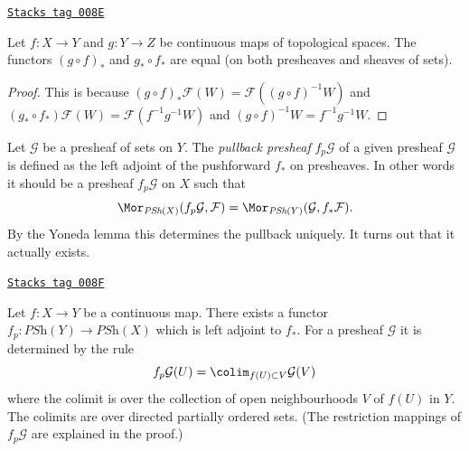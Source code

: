 \begin{lemma}
\label{sheaves-lemma-pushforward-composition}
\href{https://stacks.math.columbia.edu/tag/008E}{\texttt{Stacks tag 008E}}

Let $f : X \to Y$ and $g : Y \to Z$ be continuous maps
of topological spaces. The functors $(g \circ f)_*$
and $g_* \circ f_*$ are equal (on both presheaves
and sheaves of sets).
\end{lemma}

\begin{proof}
This is because $(g \circ f)_*\mathcal{F}(W) =
\mathcal{F}((g \circ f)^{-1}W)$ and
$(g_* \circ f_*)\mathcal{F}(W) = \mathcal{F}(f^{-1} g^{-1} W)$
and $(g \circ f)^{-1}W = f^{-1} g^{-1} W$.
\end{proof}

Let $\mathcal{G}$ be a presheaf of sets on $Y$.
The {\it pullback presheaf} $f_p\mathcal{G}$
of a given presheaf $\mathcal{G}$ is defined as the left adjoint
of the pushforward $f_*$ on presheaves. In other words it
should be a presheaf $f_p \mathcal{G}$ on $X$ such that
$$
\Mor_{\textit{PSh}(X)}(f_p\mathcal{G}, \mathcal{F})
=
\Mor_{\textit{PSh}(Y)}(\mathcal{G}, f_*\mathcal{F}).
$$
By the Yoneda lemma this determines the pullback uniquely.
It turns out that it actually exists.

\begin{lemma}
\label{sheaves-lemma-pullback-presheaves}
\href{https://stacks.math.columbia.edu/tag/008F}{\texttt{Stacks tag 008F}}

Let $f : X \to Y$ be a continuous map.
There exists a functor
$f_p : \textit{PSh}(Y) \to \textit{PSh}(X)$
which is left adjoint to $f_*$. For a presheaf
$\mathcal{G}$ it is determined by the rule
$$
f_p\mathcal{G}(U) = \colim_{f(U) \subset V} \mathcal{G}(V)
$$
where the colimit is over the collection of open neighbourhoods
$V$ of $f(U)$ in $Y$. The colimits are over
directed partially ordered sets.
(The restriction mappings of $f_p\mathcal{G}$ are explained in the proof.)
\end{lemma}

